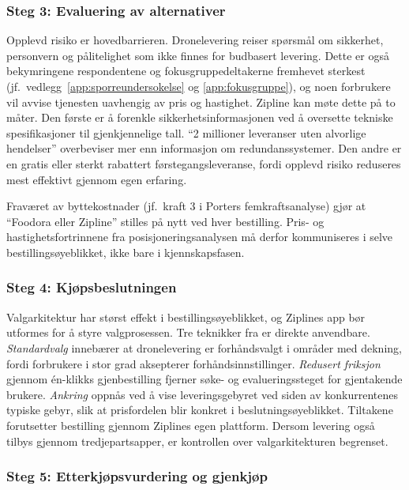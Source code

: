 \subsubsection{Steg 3: Evaluering av alternativer}

Opplevd risiko er hovedbarrieren. Dronelevering reiser spørsmål om
sikkerhet, personvern og pålitelighet som ikke finnes for budbasert
levering. Dette er også bekymringene respondentene og
fokusgruppedeltakerne fremhevet sterkest (jf.\
vedlegg~\ref{app:sporreundersokelse} og \ref{app:fokusgruppe}), og noen
forbrukere vil avvise tjenesten uavhengig av pris og hastighet. Zipline kan møte dette på to måter. Den første er å forenkle
sikkerhetsinformasjonen ved å oversette tekniske spesifikasjoner til
gjenkjennelige tall. ``2 millioner leveranser uten alvorlige hendelser''
 overbeviser mer enn informasjon om redundanssystemer. 
Den andre er en
gratis eller sterkt rabattert førstegangsleveranse, fordi opplevd risiko
reduseres mest effektivt gjennom egen erfaring.

Fraværet av byttekostnader (jf.\ kraft 3 i Porters femkraftsanalyse) gjør at
``Foodora eller Zipline'' stilles på nytt ved hver bestilling. Pris- og
hastighetsfortrinnene fra posisjoneringsanalysen må derfor kommuniseres i
selve bestillingsøyeblikket, ikke bare i kjennskapsfasen.

\subsubsection{Steg 4: Kjøpsbeslutningen}

Valgarkitektur har størst effekt i bestillingsøyeblikket, og Ziplines app bør
utformes for å styre valgprosessen. Tre teknikker fra
\textcite{muenscher2016} er direkte anvendbare. \textit{Standardvalg}
innebærer at dronelevering er forhåndsvalgt i områder med dekning, fordi
forbrukere i stor grad aksepterer forhåndsinnstillinger. \textit{Redusert
friksjon} gjennom én-klikks gjenbestilling fjerner søke- og evalueringssteget
for gjentakende brukere. \textit{Ankring} oppnås ved å vise leveringsgebyret
ved siden av konkurrentenes typiske gebyr, slik at prisfordelen blir konkret
i beslutningsøyeblikket. Tiltakene forutsetter bestilling gjennom Ziplines
egen plattform. Dersom levering også tilbys gjennom tredjepartsapper, er
kontrollen over valgarkitekturen begrenset.

\subsubsection{Steg 5: Etterkjøpsvurdering og gjenkjøp}

